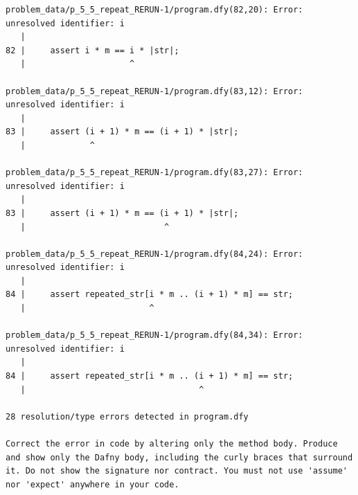 \documentclass{article}
\begin{document}
\begin{lstlisting}
problem_data/p_5_5_repeat_RERUN-1/program.dfy(82,20): Error: unresolved identifier: i
   |
82 |     assert i * m == i * |str|;
   |                     ^

problem_data/p_5_5_repeat_RERUN-1/program.dfy(83,12): Error: unresolved identifier: i
   |
83 |     assert (i + 1) * m == (i + 1) * |str|;
   |             ^

problem_data/p_5_5_repeat_RERUN-1/program.dfy(83,27): Error: unresolved identifier: i
   |
83 |     assert (i + 1) * m == (i + 1) * |str|;
   |                            ^

problem_data/p_5_5_repeat_RERUN-1/program.dfy(84,24): Error: unresolved identifier: i
   |
84 |     assert repeated_str[i * m .. (i + 1) * m] == str;
   |                         ^

problem_data/p_5_5_repeat_RERUN-1/program.dfy(84,34): Error: unresolved identifier: i
   |
84 |     assert repeated_str[i * m .. (i + 1) * m] == str;
   |                                   ^

28 resolution/type errors detected in program.dfy

Correct the error in code by altering only the method body. Produce and show only the Dafny body, including the curly braces that surround it. Do not show the signature nor contract. You must not use 'assume' nor 'expect' anywhere in your code.
\end{lstlisting}
\end{document}

